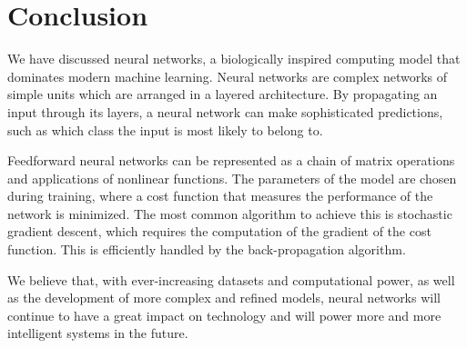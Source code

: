 \section{Conclusion}
\label{sec:conclusion}
We have discussed neural networks, a biologically inspired computing model that dominates modern machine learning. Neural networks are complex networks of simple units which are arranged in a layered architecture. By propagating an input through its layers, a neural network can make sophisticated predictions, such as which class the input is most likely to belong to.

Feedforward neural networks can be represented as a chain of matrix operations and applications of nonlinear functions. The parameters of the model are chosen during training, where a cost function that measures the performance of the network is minimized. The most common algorithm to achieve this is stochastic gradient descent, which requires the computation of the gradient of the cost function. This is efficiently handled by the back-propagation algorithm.

\begin{comment}
Deep learning, the branch of machine learning that is concerned with the development of deep neural networks, has enabled an outstanding amount of advances in the field. 
\end{comment}
We believe that, with ever-increasing datasets and computational power, as well as the development of more complex and refined models, neural networks will continue to have a great impact on technology and will power more and more intelligent systems in the future.